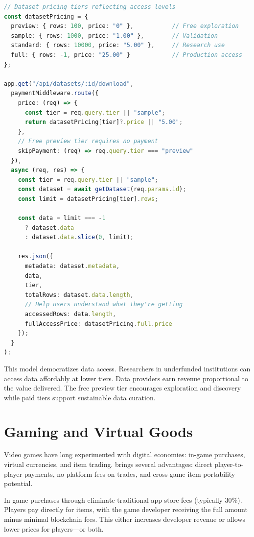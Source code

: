 \begin{lstlisting}[language=typescript,caption={Research dataset marketplace with tiered access}]
// Dataset pricing tiers reflecting access levels
const datasetPricing = {
  preview: { rows: 100, price: "0" },           // Free exploration
  sample: { rows: 1000, price: "1.00" },        // Validation
  standard: { rows: 10000, price: "5.00" },     // Research use
  full: { rows: -1, price: "25.00" }            // Production access
};

app.get("/api/datasets/:id/download",
  paymentMiddleware.route({
    price: (req) => {
      const tier = req.query.tier || "sample";
      return datasetPricing[tier]?.price || "5.00";
    },
    // Free preview tier requires no payment
    skipPayment: (req) => req.query.tier === "preview"
  }),
  async (req, res) => {
    const tier = req.query.tier || "sample";
    const dataset = await getDataset(req.params.id);
    const limit = datasetPricing[tier].rows;

    const data = limit === -1
      ? dataset.data
      : dataset.data.slice(0, limit);

    res.json({
      metadata: dataset.metadata,
      data,
      tier,
      totalRows: dataset.data.length,
      // Help users understand what they're getting
      accessedRows: data.length,
      fullAccessPrice: datasetPricing.full.price
    });
  }
);
\end{lstlisting}

This model democratizes data access. Researchers in underfunded institutions can access data affordably at lower tiers. Data providers earn revenue proportional to the value delivered. The free preview tier encourages exploration and discovery while paid tiers support sustainable data curation.

\section{Gaming and Virtual Goods}
\label{sec:gaming}

Video games have long experimented with digital economies: in-game purchases, virtual currencies, and item trading. \tprotocol{} brings several advantages: direct player-to-player payments, no platform fees on trades, and cross-game item portability potential.

In-game purchases through \tprotocol{} eliminate traditional app store fees (typically 30\%). Players pay directly for items, with the game developer receiving the full amount minus minimal blockchain fees. This either increases developer revenue or allows lower prices for players---or both.

